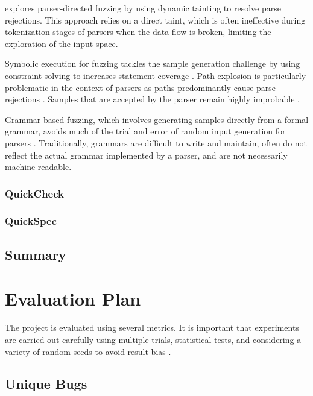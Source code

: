 \documentclass[11pt]{article}
\let\oldciteauthor\citeauthor
\renewcommand{\citeauthor}[1]{\oldciteauthor{#1} \cite{#1}}
\begin{document}
\citeauthor{parser-directed} explores parser-directed fuzzing by using dynamic tainting to resolve parse rejections. This approach relies on a direct taint, which is often ineffective during tokenization stages of parsers when the data flow is broken, limiting the exploration of the input space.

Symbolic execution for fuzzing tackles the sample generation challenge by using constraint solving to increases statement coverage \cite{klee}. Path explosion is particularly problematic in the context of parsers as paths predominantly cause parse rejections \cite{path-explosion}. Samples that are accepted by the parser remain highly improbable \cite{parser-directed}.

Grammar-based fuzzing, which involves generating samples directly from a formal grammar, avoids much of the trial and error of random input generation for parsers \cite{grammar}. Traditionally, grammars are difficult to write and maintain, often do not reflect the actual grammar implemented by a parser, and are not necessarily machine readable.

\subsubsection{QuickCheck}

\subsubsection{QuickSpec}


\subsection{Summary}

\section{Evaluation Plan} %

The project is evaluated using several metrics. It is important that experiments are carried out carefully using multiple trials, statistical tests, and considering a variety of random seeds to avoid result bias \cite{evaluation}.

\subsection{Unique Bugs}
\end{document}
